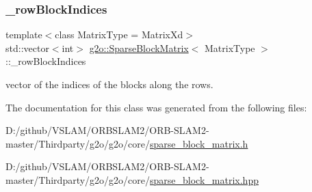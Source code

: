 \subsubsection{\texorpdfstring{\+\_\+row\+Block\+Indices}{\_rowBlockIndices}}
{\footnotesize\ttfamily template$<$class Matrix\+Type = Matrix\+Xd$>$ \\
std\+::vector$<$int$>$ \mbox{\hyperlink{classg2o_1_1_sparse_block_matrix}{g2o\+::\+Sparse\+Block\+Matrix}}$<$ Matrix\+Type $>$\+::\+\_\+row\+Block\+Indices\hspace{0.3cm}{\ttfamily [protected]}}



vector of the indices of the blocks along the rows. 



The documentation for this class was generated from the following files\+:\begin{DoxyCompactItemize}
\item 
D\+:/github/\+V\+S\+L\+A\+M/\+O\+R\+B\+S\+L\+A\+M2/\+O\+R\+B-\/\+S\+L\+A\+M2-\/master/\+Thirdparty/g2o/g2o/core/\mbox{\hyperlink{sparse__block__matrix_8h}{sparse\+\_\+block\+\_\+matrix.\+h}}\item 
D\+:/github/\+V\+S\+L\+A\+M/\+O\+R\+B\+S\+L\+A\+M2/\+O\+R\+B-\/\+S\+L\+A\+M2-\/master/\+Thirdparty/g2o/g2o/core/\mbox{\hyperlink{sparse__block__matrix_8hpp}{sparse\+\_\+block\+\_\+matrix.\+hpp}}\end{DoxyCompactItemize}
